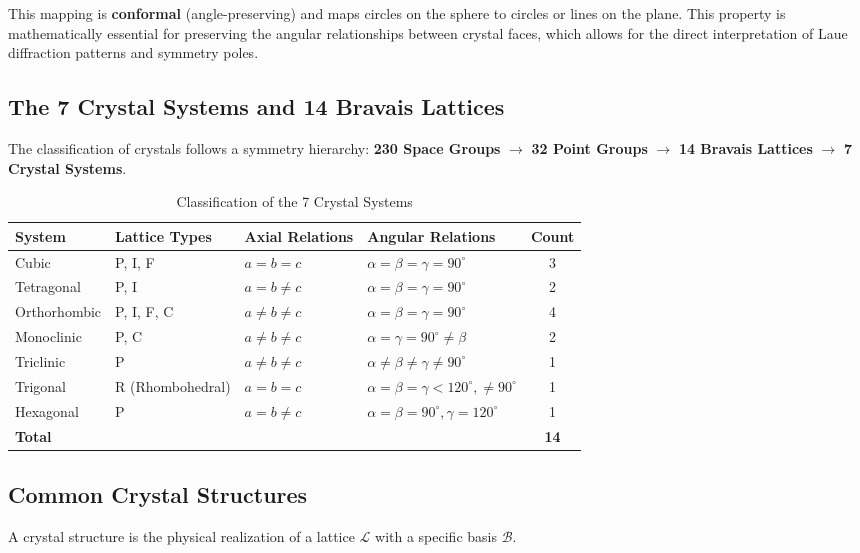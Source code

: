 \documentclass[10pt, a4paper]{article}
\begin{document}
This mapping is \textbf{conformal} (angle-preserving) and maps circles on the sphere to circles or lines on the plane. This property is mathematically essential for preserving the angular relationships between crystal faces, which allows for the direct interpretation of Laue diffraction patterns and symmetry poles.

\subsection{The 7 Crystal Systems and 14 Bravais Lattices}
The classification of crystals follows a symmetry hierarchy: 
\textbf{230 Space Groups} $\rightarrow$ \textbf{32 Point Groups} $\rightarrow$ \textbf{14 Bravais Lattices} $\rightarrow$ \textbf{7 Crystal Systems}. 

\begin{table}[H]
\centering
\caption{Classification of the 7 Crystal Systems}
\begin{tabular}{@{}llllc@{}}
\toprule
\textbf{System} & \textbf{Lattice Types} & \textbf{Axial Relations} & \textbf{Angular Relations} & \textbf{Count} \\ \midrule
Cubic & P, I, F & $a = b = c$ & $\alpha = \beta = \gamma = 90^\circ$ & 3 \\
Tetragonal & P, I & $a = b \neq c$ & $\alpha = \beta = \gamma = 90^\circ$ & 2 \\
Orthorhombic & P, I, F, C & $a \neq b \neq c$ & $\alpha = \beta = \gamma = 90^\circ$ & 4 \\
Monoclinic & P, C & $a \neq b \neq c$ & $\alpha = \gamma = 90^\circ \neq \beta$ & 2 \\
Triclinic & P & $a \neq b \neq c$ & $\alpha \neq \beta \neq \gamma \neq 90^\circ$ & 1 \\
Trigonal & R (Rhombohedral) & $a = b = c$ & $\alpha = \beta = \gamma < 120^\circ, \neq 90^\circ$ & 1 \\
Hexagonal & P & $a = b \neq c$ & $\alpha = \beta = 90^\circ, \gamma = 120^\circ$ & 1 \\ \midrule
\textbf{Total} & & & & \textbf{14} \\ \bottomrule
\end{tabular}
\end{table}



\subsection{Common Crystal Structures}
A crystal structure is the physical realization of a lattice $\mathcal{L}$ with a specific basis $\mathcal{B}$. 
\end{document}
